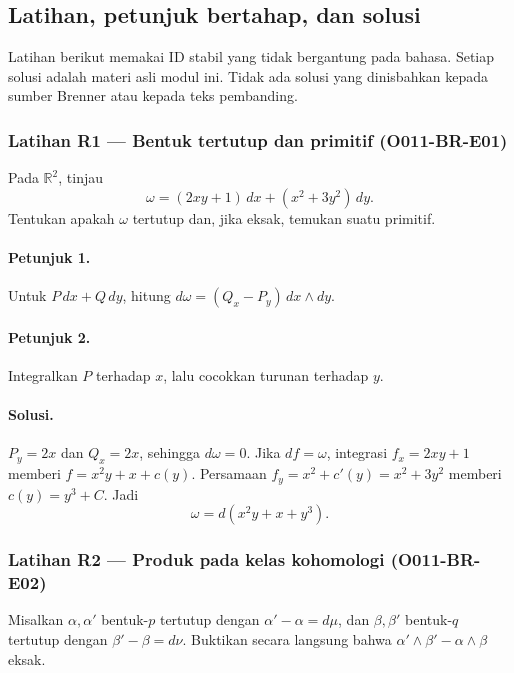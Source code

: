 
\subsection{Latihan, petunjuk bertahap, dan solusi}

Latihan berikut memakai ID stabil yang tidak bergantung pada bahasa. Setiap
solusi adalah materi asli modul ini. Tidak ada solusi yang dinisbahkan kepada
sumber Brenner atau kepada teks pembanding.

\subsubsection*{Latihan R1 — Bentuk tertutup dan primitif (O011-BR-E01)}
\label{o011-br-e01}

Pada $\mathbb R^2$, tinjau
\[
 \omega=(2xy+1)\,dx+(x^2+3y^2)\,dy.
\]
Tentukan apakah $\omega$ tertutup dan, jika eksak, temukan suatu primitif.

\paragraph{Petunjuk 1.}
Untuk $P\,dx+Q\,dy$, hitung $d\omega=(Q_x-P_y)\,dx\wedge dy$.

\paragraph{Petunjuk 2.}
Integralkan $P$ terhadap $x$, lalu cocokkan turunan terhadap $y$.

\paragraph{Solusi.}
$P_y=2x$ dan $Q_x=2x$, sehingga $d\omega=0$. Jika $df=\omega$, integrasi
$f_x=2xy+1$ memberi
$f=x^2y+x+c(y)$. Persamaan $f_y=x^2+c'(y)=x^2+3y^2$ memberi
$c(y)=y^3+C$. Jadi
\[
 \omega=d(x^2y+x+y^3).
\]

\subsubsection*{Latihan R2 — Produk pada kelas kohomologi (O011-BR-E02)}
\label{o011-br-e02}

Misalkan $\alpha,\alpha'$ bentuk-$p$ tertutup dengan
$\alpha'-\alpha=d\mu$, dan $\beta,\beta'$ bentuk-$q$ tertutup dengan
$\beta'-\beta=d\nu$. Buktikan secara langsung bahwa
$\alpha'\wedge\beta'-\alpha\wedge\beta$ eksak.

